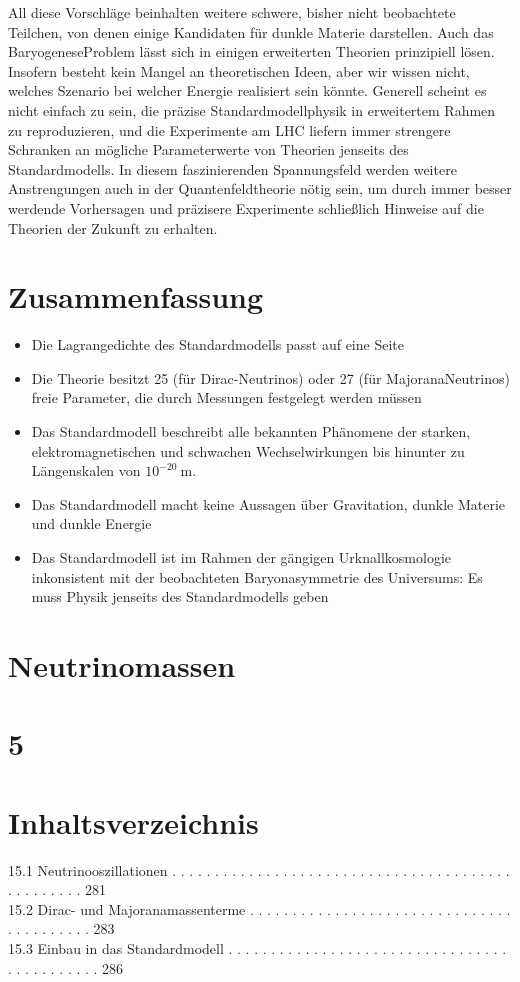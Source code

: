 \documentclass[10pt, letterpaper]{article}
\begin{document}
All diese Vorschläge beinhalten weitere schwere, bisher nicht beobachtete Teilchen, von denen einige Kandidaten für dunkle Materie darstellen. Auch das BaryogeneseProblem lässt sich in einigen erweiterten Theorien prinzipiell lösen. Insofern besteht kein Mangel an theoretischen Ideen, aber wir wissen nicht, welches Szenario bei welcher Energie realisiert sein könnte. Generell scheint es nicht einfach zu sein, die präzise Standardmodellphysik in erweitertem Rahmen zu reproduzieren, und die Experimente am LHC liefern immer strengere Schranken an mögliche Parameterwerte von Theorien jenseits des Standardmodells. In diesem faszinierenden Spannungsfeld werden weitere Anstrengungen auch in der Quantenfeldtheorie nötig sein, um durch immer besser werdende Vorhersagen und präzisere Experimente schließlich Hinweise auf die Theorien der Zukunft zu erhalten.

\section*{Zusammenfassung}
\begin{itemize}
  \item Die Lagrangedichte des Standardmodells passt auf eine Seite
  \item Die Theorie besitzt 25 (für Dirac-Neutrinos) oder 27 (für MajoranaNeutrinos) freie Parameter, die durch Messungen festgelegt werden müssen
  \item Das Standardmodell beschreibt alle bekannten Phänomene der starken, elektromagnetischen und schwachen Wechselwirkungen bis hinunter zu Längenskalen von $10^{-20} \mathrm{~m}$.
  \item Das Standardmodell macht keine Aussagen über Gravitation, dunkle Materie und dunkle Energie
  \item Das Standardmodell ist im Rahmen der gängigen Urknallkosmologie inkonsistent mit der beobachteten Baryonasymmetrie des Universums: Es muss Physik jenseits des Standardmodells geben
\end{itemize}

\section*{Neutrinomassen}
\section*{5}
\section*{Inhaltsverzeichnis}
15.1 Neutrinooszillationen . . . . . . . . . . . . . . . . . . . . . . . . . . . . . . . . . . . . . . . . . . . . . . . . . 281\\
15.2 Dirac- und Majoranamassenterme . . . . . . . . . . . . . . . . . . . . . . . . . . . . . . . . . . . . . . . . . 283\\
15.3 Einbau in das Standardmodell . . . . . . . . . . . . . . . . . . . . . . . . . . . . . . . . . . . . . . . . . . . . 286
\end{document}
